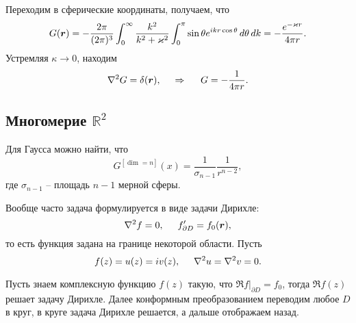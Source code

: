 Переходим в сферические координаты, получаем, что
\begin{equation*}
    G(\mbox{\boldmath $r$}) = - \frac{2 \pi}{(2 \pi)^3} \int_{0}^{\infty} \frac{k^2}{k^2 + \varkappa^2} \int_{0}^{\pi} 
    \sin \theta  e^{i k r \cos \theta}  \, d \theta \, d k = 
    - \frac{e^{- \varkappa r}}{4 \pi r}
    .
\end{equation*}
Устремляя $\kappa \to 0$, находим
\begin{equation*}
     \nabla^2 G = \delta(\mbox{\boldmath $r$}),
     \hspace{0.5cm} \Rightarrow \hspace{0.5cm}
     G = - \frac{1}{4 \pi r}.
 \end{equation*} 






\subsection{Многомерие \texorpdfstring{$\mathbb{R}^2$}{R2}}

Для Гаусса можно найти, что
\begin{equation*}
    G^{[\dim = n]}(x) = \frac{1}{\sigma_{n-1}} \frac{1}{r^{n-2}},
\end{equation*}
где $\sigma_{n-1}$ -- площадь $n-1$ мерной сферы. 



Вообще часто задача формулируется в виде задачи Дирихле:
\begin{equation*}
    \nabla^2 f = 0, 
    \hspace{5 mm} 
    f'_{\partial D} = f_0 (\mbox{\boldmath $r$}),
\end{equation*}
то есть функция задана на границе некоторой области. Пусть
\begin{equation*}
    f(z) = u(z) = i v(z),
    \hspace{5 mm} 
    \nabla^2 u = \nabla^2 v = 0.
\end{equation*}

Пусть знаем комплексную функцию $f(z)$ такую, что $\Re f |_{\partial D} = f_0$, тогда $\Re f(z)$ решает задачу Дирихле.
Далее конформным преобразованием переводим любое $D$ в круг, в круге задача Дирихле решается, а дальше отображаем назад. 


